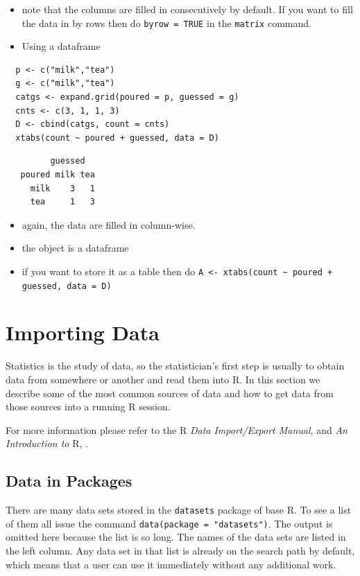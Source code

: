 \documentclass[captions=tableheading]{scrbook}
\begin{document}
\begin{itemize}
\item note that the columns are filled in consecutively by default. If you want to fill the data in by rows then do \texttt{byrow = TRUE} in the \texttt{matrix} command.
\item Using a dataframe
\end{itemize}

\begin{verbatim}
  p <- c("milk","tea")
  g <- c("milk","tea")
  catgs <- expand.grid(poured = p, guessed = g)
  cnts <- c(3, 1, 1, 3)
  D <- cbind(catgs, count = cnts)
  xtabs(count ~ poured + guessed, data = D)
\end{verbatim}

\begin{verbatim}
         guessed
   poured milk tea
     milk    3   1
     tea     1   3
\end{verbatim}

\begin{itemize}
\item again, the data are filled in column-wise.
\item the object is a dataframe
\item if you want to store it as a table then do \texttt{A <- xtabs(count \textasciitilde{} poured + guessed, data = D)}
\end{itemize}
\section{Importing Data \label{sec:Importing-A-Data}}
\label{sec-20-2}


Statistics is the study of data, so the statistician's first step is usually to obtain data from somewhere or another and read them into \textsf{R}. In this section we describe some of the most common sources of data and how to get data from those sources into a running \textsf{R} session.

For more information please refer to the \textsf{R} \emph{Data Import/Export Manual}, \cite{rstatenv} and \emph{An Introduction to} \textsf{R}, \cite{Venables2010}.
\subsection{Data in Packages}
\label{sec-20-2-1}


There are many data sets stored in the \texttt{datasets} package of base \textsf{R}. To see a list of them all issue the command \texttt{data(package = "datasets")}. The output is omitted here because the list is so long. The names of the data sets are listed in the left column. Any data set in that list is already on the search path by default, which means that a user can use it immediately without any additional work. 
\end{document}
